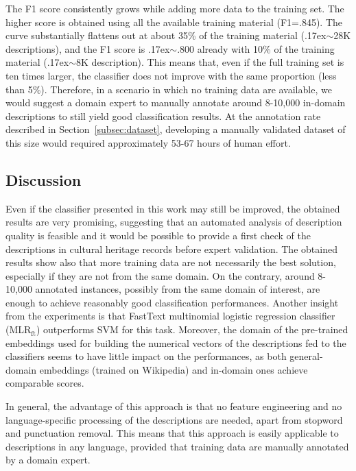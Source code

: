 \documentclass[epsfig,a4paper,12pt,titlepage]{book}
\newcommand{\mlr}{MLR$_\text{ft}$\xspace}
\newcommand{\mytilde}{\raise.17ex\hbox{$\scriptstyle\mathtt{\sim}$}}
\begin{document}
The F1 score consistently grows while adding more data to the training set. The higher score is obtained using all the available training material (F1=.845).
The curve substantially flattens out at about 35\% of the training material (\mytilde28K descriptions), and the F1 score is \mytilde.800 already with 10\% of the training material (\mytilde8K description). This means that, even if the full training set is ten times larger, the classifier does not improve with the same proportion (less than 5\%). Therefore, in a scenario in which no training data are available, we would suggest a domain expert to manually annotate around 8-10,000 in-domain descriptions to still yield good classification results. At the annotation rate described in Section~\ref{subsec:dataset}, developing a manually validated dataset of this size would required approximately 53-67 hours of human effort.
\subsection{Discussion}
\label{sec:accuremarks}
Even if the classifier presented in this work may still be improved, the obtained results are very promising, suggesting that an automated analysis of description quality is feasible and it would be possible to provide a first check of the descriptions in cultural heritage records before expert validation. The obtained results show also that more training data are not necessarily the best solution, especially if they are not from the same domain. On the contrary, around 8-10,000 annotated instances, possibly from the same domain of interest, are enough to achieve reasonably good classification performances.  Another insight from the experiments is that FastText multinomial logistic regression classifier (\mlr) outperforms SVM for this task. Moreover, the domain of the pre-trained embeddings used for building the numerical vectors of the descriptions fed to the classifiers seems to have little impact on the performances, as both general-domain embeddings (trained on Wikipedia) and in-domain ones achieve comparable scores.

In general, the advantage of this approach is that no feature engineering and no language-specific processing of the descriptions are needed, apart from stopword and punctuation removal. This means that this approach is easily applicable to descriptions in any language, provided that training data are manually annotated by a domain expert.
\end{document}

